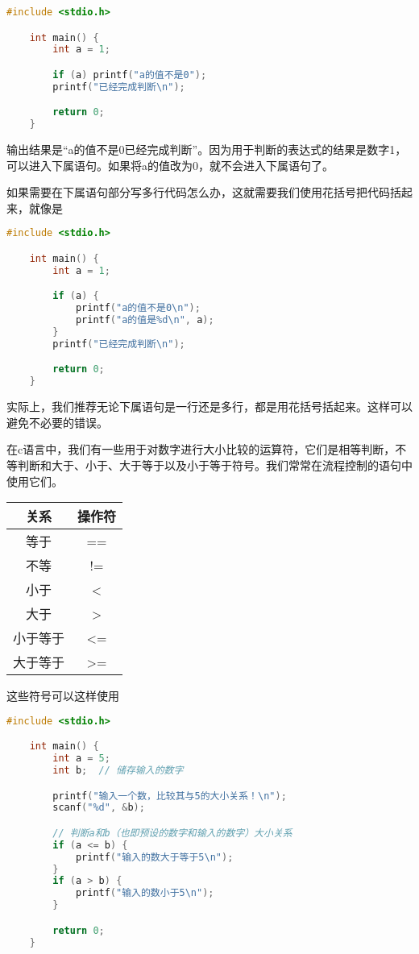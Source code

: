 \begin{lstlisting}[language=C]
    #include <stdio.h>

    int main() {
        int a = 1;

        if (a) printf("a的值不是0");
        printf("已经完成判断\n");

        return 0;
    }
\end{lstlisting}

输出结果是“a的值不是0已经完成判断”。因为用于判断的表达式的结果是数字1，可以进入下属语句。如果将a的值改为0，就不会进入下属语句了。

如果需要在下属语句部分写多行代码怎么办，这就需要我们使用花括号把代码括起来，就像是

\begin{lstlisting}[language=C]
    #include <stdio.h>

    int main() {
        int a = 1;

        if (a) {
            printf("a的值不是0\n");
            printf("a的值是%d\n", a);
        }
        printf("已经完成判断\n");

        return 0;
    }
\end{lstlisting}

实际上，我们推荐无论下属语句是一行还是多行，都是用花括号括起来。这样可以避免不必要的错误。

在c语言中，我们有一些用于对数字进行大小比较的运算符，它们是相等判断，不等判断和大于、小于、大于等于以及小于等于符号。我们常常在流程控制的语句中使用它们。

\begin{longtable}{c|c}
     关系 & 操作符\\
     \hline
     等于 & ==\\
     \hline
     不等 & !=\\
     \hline
     小于 & <\\
     \hline
     大于 & >\\
     \hline
     小于等于 & <=\\
     \hline
     大于等于 & >=\\
\end{longtable}

这些符号可以这样使用

\begin{lstlisting}[language=C]
    #include <stdio.h>

    int main() {
        int a = 5;
        int b;  // 储存输入的数字

        printf("输入一个数，比较其与5的大小关系！\n");
        scanf("%d", &b);

        // 判断a和b（也即预设的数字和输入的数字）大小关系
        if (a <= b) {
            printf("输入的数大于等于5\n");
        }
        if (a > b) {
            printf("输入的数小于5\n");
        }

        return 0;
    }
\end{lstlisting}

